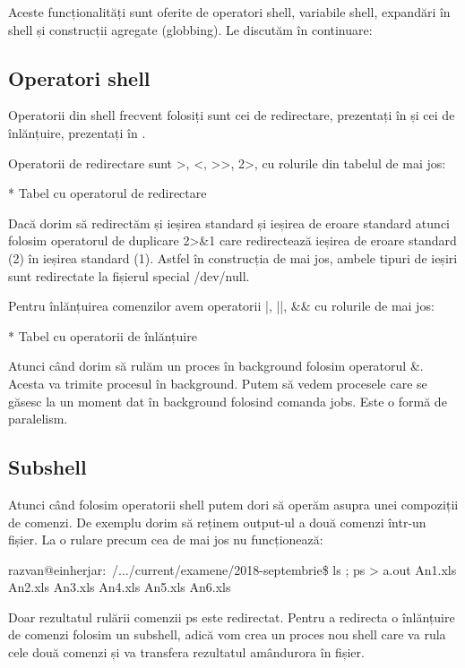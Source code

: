 Aceste funcționalități sunt oferite de operatori shell, variabile shell,
expandări în shell și construcții agregate (globbing). Le discutăm în
continuare:

\subsection{Operatori shell}
\label{sec:cli-operators}

Operatorii din shell frecvent folosiți sunt cei de redirectare, prezentați în
 și cei de înlănțuire,
prezentați în .

Operatorii de redirectare sunt >, <, >>, 2>, cu rolurile din tabelul de mai jos:

* Tabel cu operatorul de redirectare

Dacă dorim să redirectăm și ieșirea standard și ieșirea de eroare standard
atunci folosim operatorul de duplicare 2>\&1 care redirectează ieșirea de eroare
standard (2) în ieșirea standard (1). Astfel în construcția de mai jos, ambele
tipuri de ieșiri sunt redirectate la fișierul special /dev/null.

Pentru înlănțuirea comenzilor avem operatorii |, ||, \&\& cu rolurile de mai
jos:

* Tabel cu operatorii de înlănțuire

Atunci când dorim să rulăm un proces în background folosim operatorul \&. Acesta
va trimite procesul în background. Putem să vedem procesele care se găsesc la un
moment dat în background folosind comanda jobs. Este o formă de paralelism.

\subsection{Subshell}
\label{sec:cli-subshell}

Atunci când folosim operatorii shell putem dori să operăm asupra unei compoziții
de comenzi. De exemplu dorim să reținem output-ul a două comenzi într-un fișier.
La o rulare precum cea de mai jos nu funcționează:

\begin{screen}
razvan@einherjar:~/.../current/examene/2018-septembrie\$ ls ; ps > a.out
An1.xls  An2.xls  An3.xls  An4.xls  An5.xls  An6.xls
\end{screen}

Doar rezultatul rulării comenzii ps este redirectat. Pentru a redirecta o
înlănțuire de comenzi folosim un subshell, adică vom crea un proces nou shell
care va rula cele două comenzi și va transfera rezultatul amândurora în fișier.

